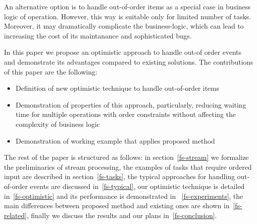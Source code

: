 An alternative option is to handle out-of-order items as a special case in business logic of operation. However, this way is suitable only for limited number of tasks. Moreover, it may dramatically complicate the business-logic, which can lead to increasing the cost of its maintanance and sophisticated bugs.    

In this paper we propose an optimistic approach to handle out-of order events and demonstrate its advantages compared to existing solutions. The contributions of this paper are the following: 
\begin {itemize}
\item Definition of new optimistic technique to handle out-of-order items
\item Demonstration of properties of this approach, particularly, reducing waiting time for multiple operations with order constraints without affecting the complexity of business logic
\item Demonstration of working example that applies proposed method
\end {itemize}

The rest of the paper is structured as follows: in section~\ref{fs-stream} we formalize the preliminaries of stream processing, the examples of tasks that require ordered input are described in section~\ref{fs-tasks}, the typical approaches for handling out-of-order events are discussed in~\ref{fs-typical}, our optimistic technique is detailed in~\ref{fs-optimistic} and its performance is demonstrated in ~\ref{fs-experiments}, the main differences between proposed method and existing ones are shown in~\ref{fs-related}, finally we discuss the results and our plans in~\ref{fs-conclusion}.